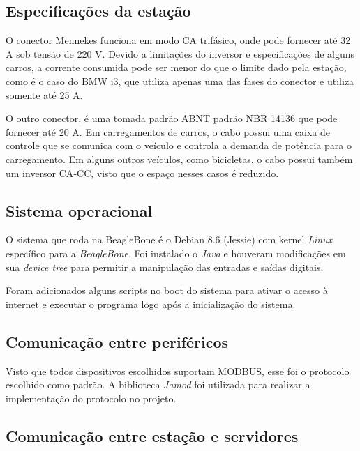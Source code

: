     \subsection{Especificações da estação}
    \label{methodology:structure:specs}

      O conector Mennekes funciona em modo \ac{CA} trifásico, onde pode fornecer até 32 A sob tensão de 220 V. Devido a limitações do inversor e especificações de alguns carros, a corrente consumida pode ser menor do que o limite dado pela estação, como é o caso do BMW i3, que utiliza apenas uma das fases do conector e utiliza somente até 25 A. 

      O outro conector, é uma tomada padrão ABNT padrão NBR 14136 \cite{nbr-14136} que pode fornecer até 20 A. Em carregamentos de carros, o cabo possui uma caixa de controle que se comunica com o veículo e controla a demanda de potência para o carregamento. Em alguns outros veículos, como bicicletas, o cabo possui também um inversor \ac{CA}-\ac{CC}, visto que o espaço nesses casos é reduzido.

    \subsection{Sistema operacional}
    \label{methodology:structure:os}

      O sistema que roda na BeagleBone é o Debian 8.6 (Jessie) com kernel \textit{Linux} específico para a \textit{BeagleBone}. Foi instalado o \textit{Java} e houveram modificações em sua \textit{device tree} para permitir a manipulação das entradas e saídas digitais.

      Foram adicionados alguns scripts no boot do sistema para ativar o acesso à internet e executar o programa logo após a inicialização do sistema.

    \subsection{Comunicação entre periféricos}
    \label{methodology:structure:com}

      Visto que todos dispositivos escolhidos suportam MODBUS, esse foi o protocolo escolhido como padrão. A biblioteca \textit{Jamod} foi utilizada para realizar a implementação do protocolo no projeto.

    \subsection{Comunicação entre estação e servidores}
    \label{methodology:structure:ocpp}

